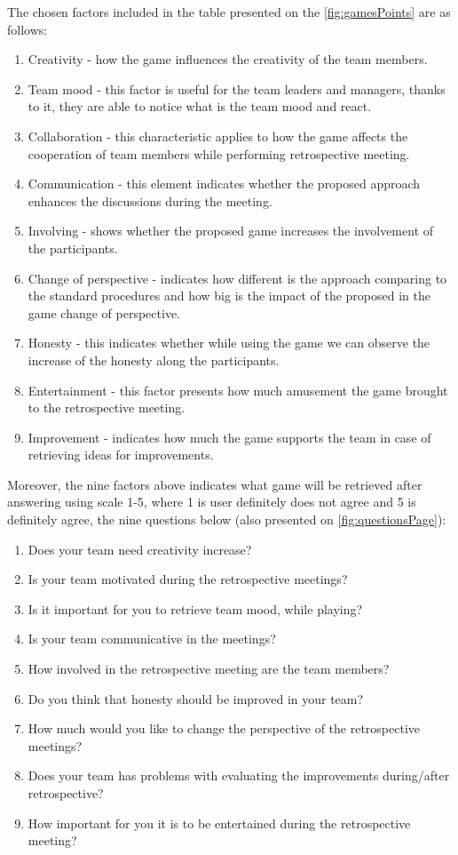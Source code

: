 The chosen factors included in the table presented on the \autoref{fig:gamesPoints} are as follows:
\begin{enumerate}
    \item Creativity - how the game influences the creativity of the team members.
    \item Team mood - this factor is useful for the team leaders and managers, thanks to it, they are able to notice what is the team mood and react.
    \item Collaboration - this characteristic applies to how the game affects the cooperation of team members while performing retrospective meeting. 
    \item Communication - this element indicates whether the proposed approach enhances the discussions during the meeting.
    \item Involving - shows whether the proposed game increases the involvement of the participants.
    \item Change of perspective - indicates how different is the approach comparing to the standard procedures and how big is the impact of the proposed in the game change of perspective.
    \item Honesty - this indicates whether while using the game we can observe the increase of the honesty along the participants.
    \item Entertainment - this factor presents how much amusement the game brought to the retrospective meeting.
    \item Improvement - indicates how much the game supports the team in case of retrieving ideas for improvements.
\end{enumerate}

Moreover, the nine factors above indicates what game will be retrieved after answering using scale 1-5, where 1 is user definitely does not agree and 5 is definitely agree, the nine questions below (also presented on \autoref{fig:questionsPage}):
\begin{enumerate}
    \item Does your team need creativity increase?
    \item Is your team motivated during the retrospective meetings?
    \item Is it important for you to retrieve team mood, while playing?
    \item Is your team communicative in the meetings?
    \item How involved in the retrospective meeting are the team members?
    \item Do you think that honesty should be improved in your team?
    \item How much would you like to change the perspective of the retrospective meetings?
    \item Does your team has problems with evaluating the improvements during/after retrospective?
    \item How important for you it is to be entertained during the retrospective meeting?
\end{enumerate}

